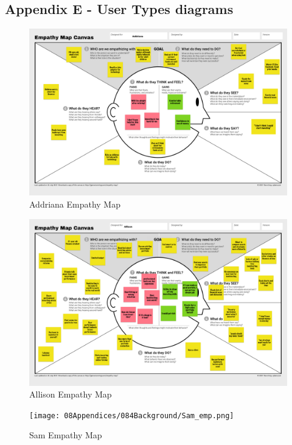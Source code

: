 \documentclass[main.tex]{subfiles}
\begin{document}
\subsection{Appendix E - User Types diagrams}
\begin{figure}[H]
    \centering
    \includegraphics[width=1.1\textwidth,height=0.8\textheight]{08Appendices/084Background/Addriana_emp.png}
    \caption{Addriana Empathy Map}
 \end{figure}

 \begin{figure}[H]
    \centering
    \includegraphics[width=1.1\textwidth,height=0.8\textheight]{08Appendices/084Background/Allison_emp.png}
    \caption{Allison Empathy Map}
 \end{figure}

 \begin{figure}[H]
    \centering
    \texttt{[image: 08Appendices/084Background/Sam\_emp.png]}
    \caption{Sam Empathy Map}
 \end{figure}
\end{document}
